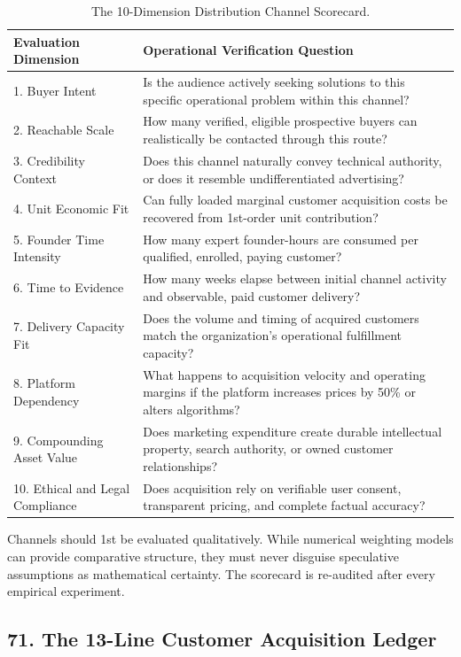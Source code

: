 \begin{table}[t]
\centering
\small
\caption{The 10-Dimension Distribution Channel Scorecard.}
\label{tab:channel_scorecard}
\begin{tabular}{p{3.2cm}p{12.2cm}}
\hline\hline
\textbf{Evaluation Dimension} & \textbf{Operational Verification Question} \\
\hline
1. Buyer Intent & Is the audience actively seeking solutions to this specific operational problem within this channel? \\
2. Reachable Scale & How many verified, eligible prospective buyers can realistically be contacted through this route? \\
3. Credibility Context & Does this channel naturally convey technical authority, or does it resemble undifferentiated advertising? \\
4. Unit Economic Fit & Can fully loaded marginal customer acquisition costs be recovered from 1st-order unit contribution? \\
5. Founder Time Intensity & How many expert founder-hours are consumed per qualified, enrolled, paying customer? \\
6. Time to Evidence & How many weeks elapse between initial channel activity and observable, paid customer delivery? \\
7. Delivery Capacity Fit & Does the volume and timing of acquired customers match the organization's operational fulfillment capacity? \\
8. Platform Dependency & What happens to acquisition velocity and operating margins if the platform increases prices by 50\% or alters algorithms? \\
9. Compounding Asset Value & Does marketing expenditure create durable intellectual property, search authority, or owned customer relationships? \\
10. Ethical and Legal Compliance & Does acquisition rely on verifiable user consent, transparent pricing, and complete factual accuracy? \\
\hline\hline
\end{tabular}
\end{table}

Channels should 1st be evaluated qualitatively. While numerical weighting models can provide comparative structure, they must never disguise speculative assumptions as mathematical certainty. The scorecard is re-audited after every empirical experiment.

\subsection*{71. The 13-Line Customer Acquisition Ledger}

